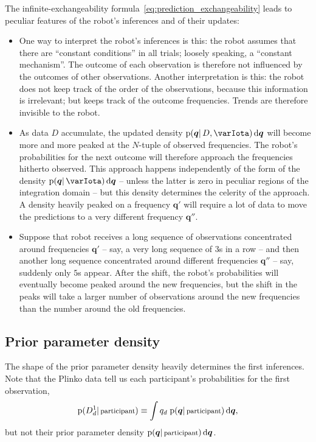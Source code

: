 \documentclass[\ifafour a4paper,12pt,\else a5paper,10pt,\fi%
onecolumn,oneside,article,%
british%
]{memoir}
\theoremstyle{remark}
\theoremstyle{innote}
\newcommand*{\di}{\mathrm{d}}%
\newcommand*{\pf}{\mathrm{p}}%
\renewcommand*{\|}{\mathpunct{|}}
\newcommand*{\yqq}{q}
\newcommand*{\yq}{\bm{\yqq}}
\newcommand*{\yI}{\varIota}
\begin{document}
The infinite-exchangeability formula~\eqref{eq:prediction_exchangeability}
leads to peculiar features of the robot's inferences and of their updates:
\begin{itemize}
\item One way to interpret the robot's inferences is this: the robot
  assumes that there are \enquote{constant conditions} in all trials;
  loosely speaking, a \enquote{constant mechanism}. The outcome of each
  observation is therefore not influenced by the outcomes of other
  observations. Another interpretation is this: the robot does not keep
  track of the order of the observations, because this information is
  irrelevant; but keeps track of the outcome frequencies. Trends are
  therefore invisible to the robot.
\item As data $D$ accumulate, the updated density
  $\pf(\yq \| D, \yI)\,\di\yq$ will become more and more peaked at the
  $N$-tuple of observed frequencies. The robot's probabilities for the next
  outcome will therefore approach the frequencies hitherto observed. This
  approach happens independently of the form of the density
  $\pf(\yq \| \yI)\,\di\yq$ -- unless the latter is zero in peculiar
  regions of the integration domain -- but this density determines the
  celerity of the approach. A density heavily peaked on a frequency $\yq'$
  will require a lot of data to move the predictions to a very different
  frequency $\yq''$.
\item Suppose that robot receives a long sequence of observations
  concentrated around frequencies $\yq'$ -- say, a very long sequence of
  $3$s in a row -- and then another long sequence concentrated around
  different frequencies $\yq''$ -- say, suddenly only $5$s appear. After
  the shift, the robot's probabilities will eventually become peaked around
  the new frequencies, but the shift in the peaks will take a larger number
  of observations around the new frequencies than the number around the old
  frequencies.
\end{itemize}


\subsection{Prior parameter density}
\label{sec:initial_prior}

The shape of the prior parameter density heavily determines the first
inferences. Note that the Plinko data tell us each participant's
probabilities for the first observation,
\begin{equation}
  \label{eq:initial_predictive}
  \pf(D^1_{d} \| \text{\footnotesize participant}) \equiv \int \yqq_{d}\;
  \pf(\yq \| \text{\footnotesize participant})\,\di\yq,
\end{equation}
but not their prior parameter density
$\pf(\yq \| \text{\footnotesize participant})\,\di\yq$.
\end{document}
